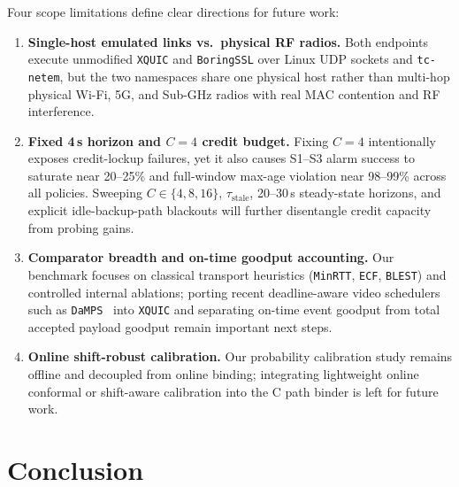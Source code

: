 \documentclass[preprint,12pt,number]{elsarticle}
\begin{document}
Four scope limitations define clear directions for future work:
\begin{enumerate}
    \item \textbf{Single-host emulated links vs.\ physical RF radios.} Both endpoints execute unmodified \texttt{XQUIC} and \texttt{BoringSSL} over Linux UDP sockets and \texttt{tc-netem}, but the two namespaces share one physical host rather than multi-hop physical Wi-Fi, 5G, and Sub-GHz radios with real MAC contention and RF interference.
    \item \textbf{Fixed 4\,s horizon and $C{=}4$ credit budget.} Fixing $C{=}4$ intentionally exposes credit-lockup failures, yet it also causes S1--S3 alarm success to saturate near 20--25\% and full-window max-age violation near 98--99\% across all policies. Sweeping $C \in \{4, 8, 16\}$, $\tau_{\text{stale}}$, 20--30\,s steady-state horizons, and explicit idle-backup-path blackouts will further disentangle credit capacity from probing gains.
    \item \textbf{Comparator breadth and on-time goodput accounting.} Our benchmark focuses on classical transport heuristics (\texttt{MinRTT}, \texttt{ECF}, \texttt{BLEST}) and controlled internal ablations; porting recent deadline-aware video schedulers such as \texttt{DaMPS}~\cite{chen2024damps} into \texttt{XQUIC} and separating on-time event goodput from total accepted payload goodput remain important next steps.
    \item \textbf{Online shift-robust calibration.} Our probability calibration study remains offline and decoupled from online binding; integrating lightweight online conformal or shift-aware calibration into the C path binder is left for future work.
\end{enumerate}

\section{Conclusion}
\label{sec:conclusion}
\end{document}
